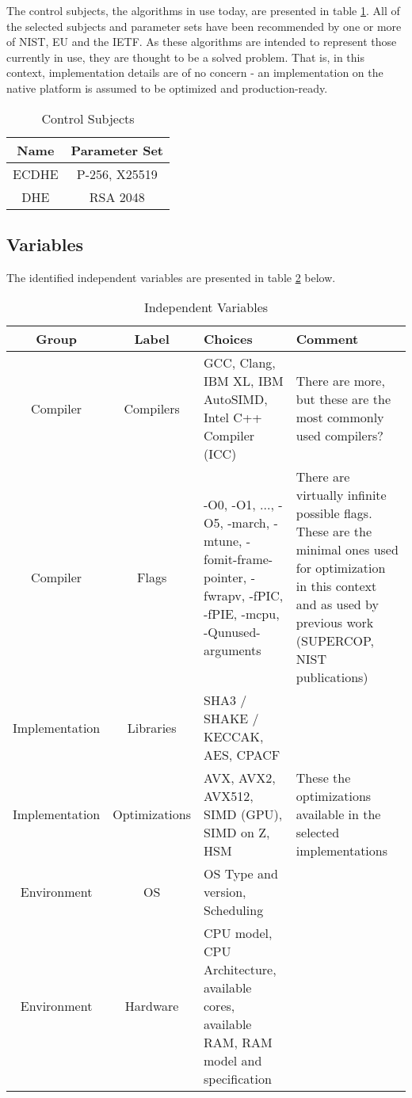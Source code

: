 The control subjects, the algorithms in use today, are presented in table \ref{table:method:experiment:control-subjects}. All of the selected subjects and parameter sets have been recommended by one or more of NIST, EU and the IETF. As these algorithms are intended to represent those currently in use, they are thought to be a solved problem. That is, in this context, implementation details are of no concern - an implementation on the native platform is assumed to be optimized and production-ready.

\begin{table}[H]
    \centering
    \begin{tabular}{c|c}
        Name & Parameter Set \\
        \hline
        ECDHE & P-256, X25519 \\
        DHE & RSA 2048 \\
    \end{tabular}
    \caption{Control Subjects}
    \label{table:method:experiment:control-subjects}
\end{table}

\subsection{Variables}

The identified independent variables are presented in table \ref{table:method:experiment:independent-variables} below.


\begin{table}[H]
    \centering
    \begin{tabular}{c|c|p{4cm}|p{3cm}}
        Group & Label & Choices & Comment \\
        \hline
        Compiler & Compilers & GCC, Clang, IBM XL, IBM AutoSIMD, Intel C++ Compiler (ICC) & There are more, but these are the most commonly used compilers? \\
        Compiler & Flags & -O0, -O1, ..., -O5, -march, -mtune, -fomit-frame-pointer, -fwrapv, -fPIC, -fPIE, -mcpu, -Qunused-arguments & There are virtually infinite possible flags. These are the minimal ones used for optimization in this context and as used by previous work (SUPERCOP, NIST publications) \\
        Implementation & Libraries & SHA3 / SHAKE / KECCAK, AES, CPACF & \\
        Implementation & Optimizations & AVX, AVX2, AVX512, SIMD (GPU), SIMD on Z, HSM & These the optimizations available in the selected implementations \\
        Environment & OS & OS Type and version, Scheduling & \\
        Environment & Hardware & CPU model, CPU Architecture, available cores, available RAM, RAM model and specification & \\
    \end{tabular}
    \caption{Independent Variables}
    \label{table:method:experiment:independent-variables}
\end{table}


